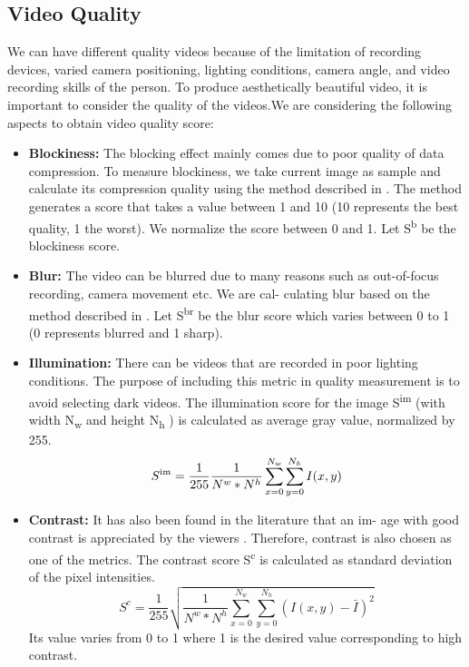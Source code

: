 \documentclass{sig-alternate-05-2015}
\begin{document}
\subsection{Video Quality}
We can have different quality videos because of the limitation of
recording devices, varied camera positioning, lighting conditions,
camera angle, and video recording skills of the person. To produce
aesthetically beautiful video, it is important to consider the quality
of the videos.We are considering the following aspects to obtain
video quality score:
\begin{itemize}
\item \textbf{Blockiness:} The blocking effect mainly comes due to poor
quality of data compression. To measure blockiness, we take
current image as sample and calculate its compression quality using the method described in \cite{18}. The method generates
a score that takes a value between 1 and 10 (10 represents the
best quality, 1 the worst). We normalize the score between 0
and 1. Let S\textsuperscript{b} be the blockiness score.
\item \textbf{Blur:} The video can be blurred due to many reasons such as
out-of-focus recording, camera movement etc. We are cal-
culating blur based on the method described in \cite{5}. Let S\textsuperscript{br}
be the blur score which varies between 0 to 1 (0 represents
blurred and 1 sharp).
\item \textbf{Illumination:} There can be videos that are recorded in poor
lighting conditions. The purpose of including this metric in
quality measurement is to avoid selecting dark videos. The
illumination score for the image S\textsuperscript{im} (with width N\textsubscript{w} and
height N\textsubscript{h} ) is calculated as average gray value, normalized
by 255.
\begin{equation}
S\textsuperscript{im}=\frac{1}{255}\frac{1}{N^w \ast N^h} \sum_{x=0}^{N_w}\sum_{y=0}^{N_h} I(x,y) 
\end{equation}
\item 
\textbf{Contrast:} It has also been found in the literature that an im-
age with good contrast is appreciated by the viewers \cite{10}.
Therefore, contrast is also chosen as one of the metrics. The
contrast score S\textsuperscript{c} is calculated as standard deviation of the
pixel intensities.
\begin{equation}
S^c= \frac{1}{255}\sqrt{\frac{1}{N^w \ast N^h} \sum_{x=0}^{N_w}\sum_{y=0}^{N_h} (I(x,y)-\bar{I})^2}
\end{equation}
Its value varies from 0 to 1 where 1 is the desired value corresponding to high contrast.

\end{itemize}
\end{document}
